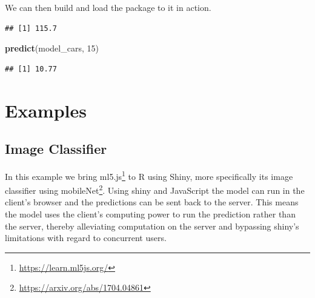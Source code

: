 \documentclass[
]{krantz}
\makeatletter
\newenvironment{Shaded}{\begin{snugshade}}{\end{snugshade}}
\newcommand{\CommentTok}[1]{\textcolor[rgb]{0.37,0.37,0.37}{\textit{#1}}}
\newcommand{\DecValTok}[1]{\textcolor[rgb]{0.06,0.06,0.06}{#1}}
\newcommand{\KeywordTok}[1]{\textcolor[rgb]{0.27,0.27,0.27}{\textbf{#1}}}
\newcommand{\NormalTok}[1]{#1}
\newcommand{\OperatorTok}[1]{\textcolor[rgb]{0.43,0.43,0.43}{\textbf{#1}}}
\newcommand{\StringTok}[1]{\textcolor[rgb]{0.5,0.5,0.5}{#1}}
\renewcommand{\href}[2]{#2\footnote{\url{#1}}}
\newenvironment{kframe}{%
\medskip{}
\setlength{\fboxsep}{.8em}
 \def\at@end@of@kframe{}%
 \ifinner\ifhmode%
  \def\at@end@of@kframe{\end{minipage}}%
  \begin{minipage}{\columnwidth}%
 \fi\fi%
 \def\FrameCommand##1{\hskip\@totalleftmargin \hskip-\fboxsep
 \colorbox{shadecolor}{##1}\hskip-\fboxsep
     \hskip-\linewidth \hskip-\@totalleftmargin \hskip\columnwidth}%
 \MakeFramed {\advance\hsize-\width
   \@totalleftmargin\z@ \linewidth\hsize
   \@setminipage}}%
 {\par\unskip\endMakeFramed%
 \at@end@of@kframe}
\renewenvironment{Shaded}{\begin{kframe}}{\end{kframe}}
\makeatother
\begin{document}
We can then build and load the package to it in action.

\begin{Shaded}
\end{Shaded}

\begin{verbatim}
## [1] 115.7
\end{verbatim}

\begin{Shaded}
\begin{Highlighting}[]
\KeywordTok{predict}\NormalTok{(model\_cars, }\DecValTok{15}\NormalTok{)}
\end{Highlighting}
\end{Shaded}

\begin{verbatim}
## [1] 10.77
\end{verbatim}

\hypertarget{part-examples}{%
\part{Examples}\label{part-examples}}

\hypertarget{v8-img}{%
\chapter{Image Classifier}\label{v8-img}}

In this example we bring \href{https://learn.ml5js.org/}{ml5.js} to R using Shiny, more specifically its image classifier using \href{https://arxiv.org/abs/1704.04861}{mobileNet}. Using shiny and JavaScript the model can run in the client's browser and the predictions can be sent back to the server. This means the model uses the client's computing power to run the prediction rather than the server, thereby alleviating computation on the server and bypassing shiny's limitations with regard to concurrent users.
\end{document}
